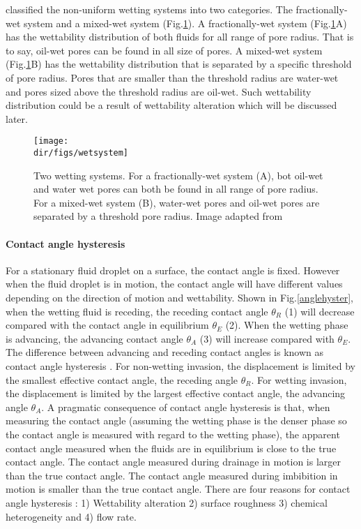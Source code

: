 \citet{mcdougall1995impact} classified the non-uniform wetting systems into two categories. The fractionally-wet system and a mixed-wet system (Fig.\ref{wetsystem}). A fractionally-wet system (Fig.\ref{wetsystem}A) has the wettability distribution of both fluids for all range of pore radius. That is to say, oil-wet pores can be found in all size of pores. A mixed-wet system (Fig.\ref{wetsystem}B) has the wettability distribution that is separated by a specific threshold of pore radius. Pores that are smaller than the threshold radius are water-wet and pores sized above the threshold radius are oil-wet. Such wettability distribution could be a result of wettability alteration which will be discussed later.

\begin{figure}[htbp]
  \centering
  \texttt{[image: \\dir/figs/wetsystem]}
  \caption{Two wetting systems. For a fractionally-wet system (A), bot oil-wet and water wet pores can both be found in all range of pore radius. For a mixed-wet system (B), water-wet pores and oil-wet pores are separated by a threshold pore radius. Image adapted from \citet{mcdougall1995impact}}
  \label{wetsystem}
\end{figure}

\paragraph{Contact angle hysteresis}
For a stationary fluid droplet on a surface, the contact angle is fixed. However when the fluid droplet is in motion, the contact angle will have different values depending on the direction of motion and wettability. Shown in Fig.\ref{anglehyster}, when the wetting fluid is receding, the receding contact angle $\theta_R$ (1) will decrease compared with the contact angle in equilibrium $\theta_E$ (2). When the wetting phase is advancing, the advancing contact angle $\theta_A$ (3) will increase  compared with $\theta_E$. The difference between advancing and receding contact angles is known as contact angle hysteresis \citep{gao2006contact}. For non-wetting invasion, the displacement is limited by the smallest effective contact angle, the receding angle $\theta_R$. For wetting invasion, the displacement is limited by the largest effective contact angle, the advancing angle $\theta_A$. A pragmatic consequence of contact angle hysteresis is that, when measuring the contact angle (assuming the wetting phase is the denser phase so the contact angle is measured with regard to the wetting phase), the apparent contact angle measured when the fluids are in equilibrium is close to the true contact angle. The contact angle measured during drainage in motion is larger than the true contact angle. The contact angle measured during imbibition in motion is smaller than the true contact angle. There are four reasons for contact angle hysteresis \citep{blunt2017multiphase}: 1) Wettability alteration 2) surface roughness 3) chemical heterogeneity and 4) flow rate.


